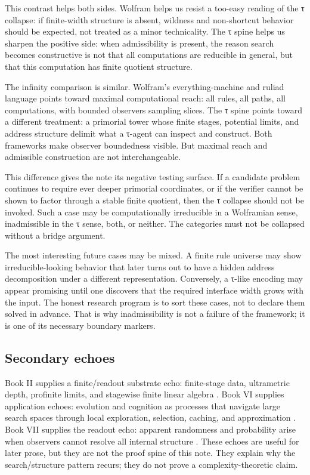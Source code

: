 \documentclass{pantarhei-researchnote}
\begin{document}
This contrast helps both sides. Wolfram helps us resist a too-easy
reading of the τ collapse: if finite-width structure is absent, wildness
and non-shortcut behavior should be expected, not treated as a minor
technicality. The τ spine helps us sharpen the positive side: when
admissibility is present, the reason search becomes constructive is not
that all computations are reducible in general, but that this computation
has finite quotient structure.

The infinity comparison is similar. Wolfram's everything-machine and
ruliad language points toward maximal computational reach: all rules, all
paths, all computations, with bounded observers sampling slices. The τ
spine points toward a different treatment: a primorial tower whose finite
stages, potential limits, and address structure delimit what a τ-agent can
inspect and construct. Both frameworks make observer boundedness visible.
But maximal reach and admissible construction are not interchangeable.

This difference gives the note its negative testing surface. If a
candidate problem continues to require ever deeper primorial coordinates,
or if the verifier cannot be shown to factor through a stable finite
quotient, then the τ collapse should not be invoked. Such a case may be
computationally irreducible in a Wolframian sense, inadmissible in the τ
sense, both, or neither. The categories must not be collapsed without a
bridge argument.

The most interesting future cases may be mixed. A finite rule universe
may show irreducible-looking behavior that later turns out to have a
hidden address decomposition under a different representation. Conversely,
a τ-like encoding may appear promising until one discovers that the
required interface width grows with the input. The honest research
program is to sort these cases, not to declare them solved in advance.
That is why inadmissibility is not a failure of the framework; it is one
of its necessary boundary markers.

\subsection{Secondary echoes}

Book II supplies a finite/readout substrate echo: finite-stage data,
ultrametric depth, profinite limits, and stagewise finite linear algebra
\cite{PR-II}. Book VI supplies application echoes: evolution and cognition
as processes that navigate large search spaces through local exploration,
selection, caching, and approximation \cite{PR-VI}. Book VII supplies the
readout echo: apparent randomness and probability arise when observers
cannot resolve all internal structure \cite{PR-VII}. These echoes are
useful for later prose, but they are not the proof spine of this note.
They explain why the search/structure pattern recurs; they do not prove a
complexity-theoretic claim.
\end{document}
